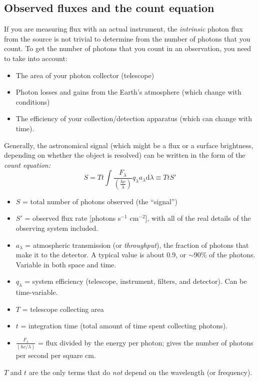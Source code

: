 \documentclass[12pt]{article}
\begin{document}
\subsection{Observed fluxes and the count equation}
If you are measuring flux with an actual instrument, the \emph{intrinsic}
photon flux from the source is not trivial to determine from the number of
photons that you count. To get the number of photons that you count in an
observation, you need to take into account:
\begin{itemize}
    \item The area of your photon collector (telescope)
    \item Photon losses and gains from the Earth's atmosphere (which change
        with conditions)
    \item The efficiency of your collection/detection apparatus (which can
        change with time).
\end{itemize}
Generally, the astronomical signal (which might be a flux or a
surface brightness, depending on whether the object is resolved)
can be written in the form of the \textit{count equation:}
\[
    S = Tt \int \frac{F_{\lambda}}
    {\left(\frac{hc}{\lambda}\right)}q_{\lambda}
    a_{\lambda}\mathrm{d}\lambda \equiv TtS'
    \]
\begin{itemize}
    \item $S$ = total number of photons observed (the ``signal'')
    \item $S'$ = observed flux rate [photons s$^{-1}$ cm$^{-2}$],
        with all of the real details of the observing system included.
    \item $a_{\lambda}$ = atmospheric transmission
        (or \emph{throughput}), the fraction of photons that
        make it to the detector.
        A typical value is about 0.9, or $\sim$90\% of the photons.
        Variable in both space and time.
    \item $q_{\lambda}$ = system efficiency
        (telescope, instrument, filters, and detector). Can be
        time-variable.
    \item $T$ = telescope collecting area
    \item $t$ = integration time
        (total amount of time spent collecting photons).
    \item $\frac{F_{\lambda}}{\left(hc/\lambda\right)}$ =
        flux divided by the energy per photon;
        gives the number of photons per second per square cm.
\end{itemize}
$T$ and $t$ are the only terms that do \emph{not} depend on
the wavelength (or frequency).
\end{document}
